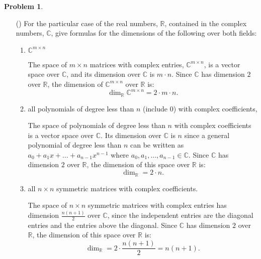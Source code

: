 \documentclass[12pt]{article}
\theoremstyle{definition}
\newtheorem{problem}{Problem}
\newcounter{subq}[problem]
\newenvironment{subproblem}
{\refstepcounter{subq} \begin{itemize} \item[(\alph{subq})]}
{\end{itemize} \medskip}
\begin{document}
\begin{problem}
    \begin{subproblem}
        For the particular case of the real numbers, $\mathbb{R}$, contained in the complex numbers, $\mathbb{C}$, give formulas for the
        dimensions of the following over both fields:
        \begin{enumerate}[label=(\roman*)]
            \item $\mathbb{C}^{m \times n}$\\
            \begin{solution}
                The space of $m \times n$ matrices with complex entries, $\mathbb{C}^{m \times n}$, is a vector space over $\mathbb{C}$, and its dimension over $\mathbb{C}$ is $m \cdot n$. Since $\mathbb{C}$ has dimension $2$ over $\mathbb{R}$, the dimension of $\mathbb{C}^{m \times n}$ over $\mathbb{R}$ is:
                \[
                \dim_{\mathbb{R}} \mathbb{C}^{m \times n} = 2 \cdot m \cdot n.
                \]
            \end{solution}
            \item all polynomials of degree less than $n$ (include 0) with complex coefficients,\\
            \begin{solution}
                The space of polynomials of degree less than $n$ with complex coefficients is a vector space over $\mathbb{C}$. Its dimension over $\mathbb{C}$ is $n$ since a general polynomial of degree less than $n$ can be written as $a_0 + a_1 x + \dots + a_{n-1} x^{n-1}$ where $a_0, a_1, \dots, a_{n-1} \in \mathbb{C}$. Since $\mathbb{C}$ has dimension $2$ over $\mathbb{R}$, the dimension of this space over $\mathbb{R}$ is:
                \[
                \dim_{\mathbb{R}} = 2 \cdot n.
                \]
            \end{solution}
            \item all $n \times n$ symmetric matrices with complex coefficients.\\
            \begin{solution}
                The space of $n \times n$ symmetric matrices with complex entries has dimension $\frac{n(n+1)}{2}$ over $\mathbb{C}$, since the independent entries are the diagonal entries and the entries above the diagonal. Since $\mathbb{C}$ has dimension $2$ over $\mathbb{R}$, the dimension of this space over $\mathbb{R}$ is:
                \[
                \dim_{\mathbb{R}} = 2 \cdot \frac{n(n+1)}{2} = n(n+1).
                \]
            \end{solution}
        \end{enumerate}
    \end{subproblem}


\end{problem}
\end{document}
